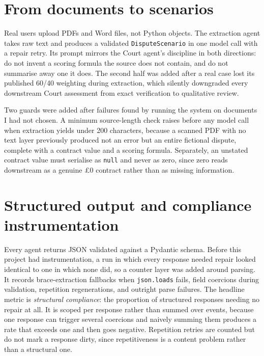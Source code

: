 \section{From documents to scenarios}
\label{sec:extraction}

Real users upload PDFs and Word files, not Python objects. The extraction agent
takes raw text and produces a validated \texttt{DisputeScenario} in one model call
with a repair retry. Its prompt mirrors the Court agent's discipline in both
directions: do not invent a scoring formula the source does not contain, and do
not summarise away one it does. The second half was added after a real case
lost its published 60/40 weighting during extraction, which silently downgraded
every downstream Court assessment from exact verification to qualitative review.

Two guards were added after failures found by running the system on documents I
had not chosen. A minimum source-length check raises before any model call when
extraction yields under 200 characters, because a scanned PDF with no text layer
previously produced not an error but an entire fictional dispute, complete with a
contract value and a scoring formula. Separately, an unstated contract value must
serialise as \texttt{null} and never as zero, since zero reads downstream as a
genuine \pounds0 contract rather than as missing information.

\section{Structured output and compliance instrumentation}
\label{sec:compliance-method}

Every agent returns JSON validated against a Pydantic schema. Before this project
had instrumentation, a run in which every response needed repair looked identical
to one in which none did, so a counter layer was added around parsing. It records
brace-extraction fallbacks when \texttt{json.loads} fails, field coercions during
validation, repetition regenerations, and outright parse failures. The headline
metric is \emph{structural compliance}: the proportion of structured responses
needing no repair at all. It is scoped per response rather than summed over
events, because one response can trigger several coercions and naively summing
them produces a rate that exceeds one and then goes negative. Repetition retries
are counted but do not mark a response dirty, since repetitiveness is a content
problem rather than a structural one.

